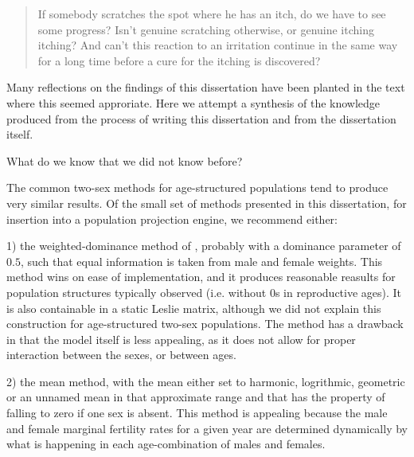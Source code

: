 \FloatBarrier
\label{sec:reflections}


\begin{singlespace}
\begin{quote}
 If somebody scratches the spot where he has an itch, do we have to see 
 some progress? Isn't genuine scratching otherwise, or genuine itching 
itching? And can't this reaction to an irritation continue in the 
same way for a long time before a cure for the itching is discovered?
\citep{wittgenstein1984culture}
\end{quote}
\end{singlespace}

Many reflections on the findings of this dissertation have been planted in the
text where this seemed approriate. Here we attempt a synthesis of the
knowledge produced from the process of writing this dissertation and from the
dissertation itself.

What do we know that we did not know before?

The common two-sex methods for age-structured populations tend to produce very
similar results. Of the small set of methods presented in this dissertation, for
insertion into a population projection engine, we recommend either:

1) the weighted-dominance method of \citet{goodman1967age}, probably with a
dominance parameter of $0.5$, such that equal information is taken from male and female
weights. This method wins on ease of implementation, and it produces reasonable
reasults for population structures typically observed (i.e. without 0s in
reproductive ages). It is also containable in a static Leslie matrix, although
we did not explain this construction for age-structured two-sex populations. The
method has a drawback in that the model itself is less appealing, as it does 
not allow for proper interaction between the sexes, or between ages.

2) the mean method, with the mean either set to harmonic, logrithmic,
geometric or an unnamed mean in that approximate range and that has the property
of falling to zero if one sex is absent. This method is appealing because the
male and female marginal fertility rates for a given year are determined
dynamically by what is happening in each age-combination of males and females.


